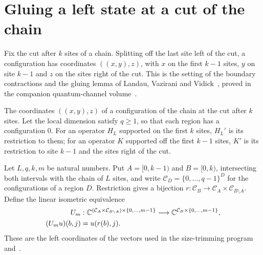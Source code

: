 \section{Gluing a left state at a cut of the chain}
\label{sec:chain_gluing}

Fix the cut after $k$ sites of a chain. Splitting off the last site left of
the cut, a configuration has coordinates $((x,y),z)$, with $x$ on the first
$k-1$ sites, $y$ on site $k-1$ and $z$ on the sites right of the cut. This is
the setting of the boundary contractions and the gluing lemma of Landau,
Vazirani and Vidick~\cite[lines 409--447]{Landau2015Polynomial}, proved in the
companion quantum-channel
volume~\cite[``Gluing'', ``The leading eigenvector of a near-optimal left state'',
    ``Three-way cut coordinates'']{QICLean2026Blueprint}.

\begin{definition}
    \label{def:chain_gluing_cut}
    \leanok
    The coordinates $((x,y),z)$ of a configuration of the chain at the cut
    after $k$ sites. Let the local dimension satisfy $q\ge1$, so that each
    region has a configuration $0$. For an operator $H_L$ supported on the
    first $k$ sites, $H_L'$ is its restriction to them; for an operator $K$
    supported off the first $k-1$ sites, $K'$ is its restriction to site $k-1$
    and the sites right of the cut.
\end{definition}

\begin{definition}
    \label{def:chain_gluing_left_coordinates}
    \leanok
    Let $L,q,k,m$ be natural numbers. Put $A=\lbrack0,k-1)$ and $B=\lbrack0,k)$,
    intersecting both intervals with the chain of $L$ sites, and write
    $\mathcal C_D=\{0,\ldots,q-1\}^{D}$ for the configurations of a region $D$.
    Restriction gives a bijection
    $r:\mathcal C_B\to\mathcal C_A\times\mathcal C_{B\setminus A}$.
    Define the linear isometric equivalence
    \begin{align}
        U_m          & :\mathbb C^{(\mathcal C_A\times\mathcal C_{B\setminus A})\times\{0,\ldots,m-1\}}
        \longrightarrow\mathbb C^{\mathcal C_B\times\{0,\ldots,m-1\}},                                  \\
        (U_m u)(b,j) & =u(r(b),j). \notag
    \end{align}
    These are the left coordinates of the vectors used in the size-trimming
    program and~\cite[Lemma~2.5, source lines 472--478 and 493--505]{Landau2015Polynomial}.
\end{definition}

